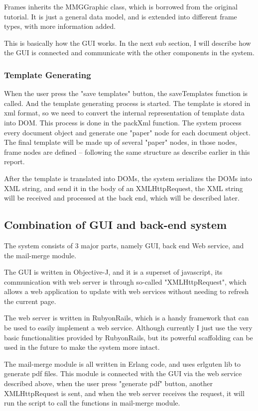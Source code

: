\documentclass[12pt,twoside,a4paper]{report}
\begin{document}
  Frames inherits the MMGGraphic class, which is borrowed from the original tutorial. It is just a general data model, and is extended into different frame types, with more information added.

  This is basically how the GUI works. In the next sub section, I will describe how the GUI is connected and communicate with the other components in the system.

\subsubsection{Template Generating}
 
  When the user press the "save templates" button, the saveTemplates function is called. And the template generating process is started. The template is stored in xml format, so we need to convert the internal representation of template data into DOM\cite{dom}. This process is done in the packXml function. The system process every document object and generate one "paper" node for each document object. The final template will be made up of several "paper" nodes, in those nodes, frame nodes are defined -- following the same structure as describe earlier in this report. 

  After the template is translated into DOMs, the system serializes the DOMs into XML string, and send it in the body of an XMLHttpRequest, the XML string will be received and processed at the back end, which will be described later.

\subsection{Combination of GUI and back-end system}

  The system consists of 3 major parts, namely GUI, back end Web service, and the mail-merge module. 

  The GUI is written in Objective-J, and it is a superset of javascript, its communication with web server is through so-called "XMLHttpRequest", which allows a web application to update with web services without needing to refresh the current page. 

  The web server is written in RubyonRails, which is a handy framework that can be used to easily implement a web service. Although currently I just use the very basic functionalities provided by RubyonRails, but its powerful scaffolding can be used in the future to make the system more intact. 

  The mail-merge module is all written in Erlang code, and uses erlguten lib to generate pdf files. This module is connected with the GUI via the web service described above, when the user press "generate pdf" button, another XMLHttpRequest is sent, and when the web server receives the request, it will run the script to call the functions in mail-merge module. 
\end{document}
